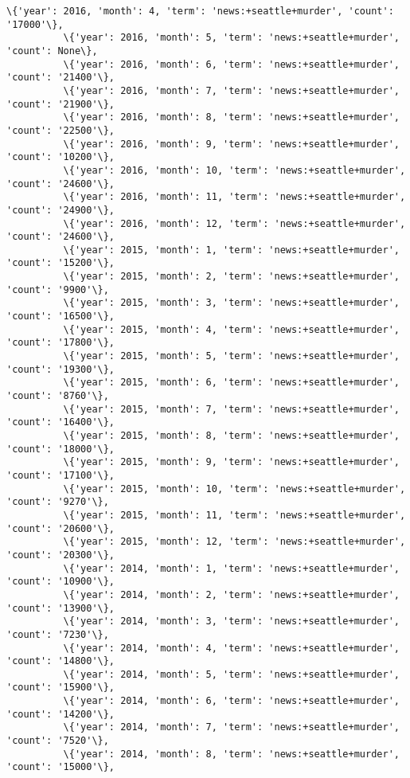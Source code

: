 \documentclass[11pt]{article}
\begin{document}
\begin{Verbatim}[commandchars=\\\{\}]
          \{'year': 2016, 'month': 4, 'term': 'news:+seattle+murder', 'count': '17000'\},
          \{'year': 2016, 'month': 5, 'term': 'news:+seattle+murder', 'count': None\},
          \{'year': 2016, 'month': 6, 'term': 'news:+seattle+murder', 'count': '21400'\},
          \{'year': 2016, 'month': 7, 'term': 'news:+seattle+murder', 'count': '21900'\},
          \{'year': 2016, 'month': 8, 'term': 'news:+seattle+murder', 'count': '22500'\},
          \{'year': 2016, 'month': 9, 'term': 'news:+seattle+murder', 'count': '10200'\},
          \{'year': 2016, 'month': 10, 'term': 'news:+seattle+murder', 'count': '24600'\},
          \{'year': 2016, 'month': 11, 'term': 'news:+seattle+murder', 'count': '24900'\},
          \{'year': 2016, 'month': 12, 'term': 'news:+seattle+murder', 'count': '24600'\},
          \{'year': 2015, 'month': 1, 'term': 'news:+seattle+murder', 'count': '15200'\},
          \{'year': 2015, 'month': 2, 'term': 'news:+seattle+murder', 'count': '9900'\},
          \{'year': 2015, 'month': 3, 'term': 'news:+seattle+murder', 'count': '16500'\},
          \{'year': 2015, 'month': 4, 'term': 'news:+seattle+murder', 'count': '17800'\},
          \{'year': 2015, 'month': 5, 'term': 'news:+seattle+murder', 'count': '19300'\},
          \{'year': 2015, 'month': 6, 'term': 'news:+seattle+murder', 'count': '8760'\},
          \{'year': 2015, 'month': 7, 'term': 'news:+seattle+murder', 'count': '16400'\},
          \{'year': 2015, 'month': 8, 'term': 'news:+seattle+murder', 'count': '18000'\},
          \{'year': 2015, 'month': 9, 'term': 'news:+seattle+murder', 'count': '17100'\},
          \{'year': 2015, 'month': 10, 'term': 'news:+seattle+murder', 'count': '9270'\},
          \{'year': 2015, 'month': 11, 'term': 'news:+seattle+murder', 'count': '20600'\},
          \{'year': 2015, 'month': 12, 'term': 'news:+seattle+murder', 'count': '20300'\},
          \{'year': 2014, 'month': 1, 'term': 'news:+seattle+murder', 'count': '10900'\},
          \{'year': 2014, 'month': 2, 'term': 'news:+seattle+murder', 'count': '13900'\},
          \{'year': 2014, 'month': 3, 'term': 'news:+seattle+murder', 'count': '7230'\},
          \{'year': 2014, 'month': 4, 'term': 'news:+seattle+murder', 'count': '14800'\},
          \{'year': 2014, 'month': 5, 'term': 'news:+seattle+murder', 'count': '15900'\},
          \{'year': 2014, 'month': 6, 'term': 'news:+seattle+murder', 'count': '14200'\},
          \{'year': 2014, 'month': 7, 'term': 'news:+seattle+murder', 'count': '7520'\},
          \{'year': 2014, 'month': 8, 'term': 'news:+seattle+murder', 'count': '15000'\},

\end{Verbatim}
\end{document}

